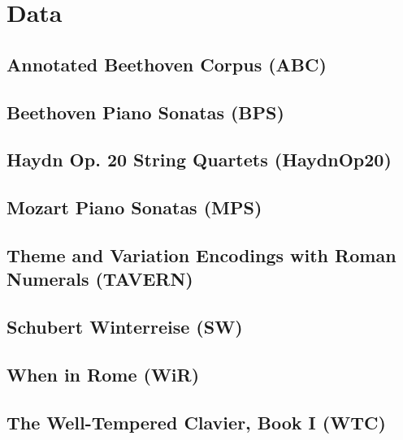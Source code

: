 \chapter{Data}
\label{chap:chap4}


\section{Annotated Beethoven Corpus (ABC)}
\section{Beethoven Piano Sonatas (BPS)}
\section{Haydn Op. 20 String Quartets (HaydnOp20)}
\section{Mozart Piano Sonatas (MPS)}
\section{Theme and Variation Encodings with Roman Numerals (TAVERN)}
\section{Schubert Winterreise (SW)}
\section{When in Rome (WiR)}
\section{The Well-Tempered Clavier, Book I (WTC)}



